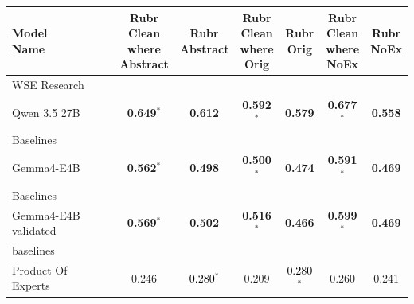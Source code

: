 \begin{tabularx}{\textwidth}{X | c c c c c c}
\hline
\makecell[b]{\textbf{Model} \\ \textbf{Name}} & \makecell[b]{\textbf{Rubr} \\ \textbf{Clean} \\ \textbf{where} \\ \textbf{Abstract}} & \makecell[b]{\textbf{Rubr} \\ \textbf{Abstract}} & \makecell[b]{\textbf{Rubr} \\ \textbf{Clean} \\ \textbf{where} \\ \textbf{Orig}} & \makecell[b]{\textbf{Rubr} \\ \textbf{Orig}} & \makecell[b]{\textbf{Rubr} \\ \textbf{Clean} \\ \textbf{where} \\ \textbf{NoEx}} & \makecell[b]{\textbf{Rubr} \\ \textbf{NoEx}} \\
\hline
WSE Research\\\subcatarrow{}Qwen 3.5 27B & \textbf{\textcolor{BrickRed}{0.649$^{*}$}} & \textbf{\textcolor{BrickRed}{0.612}} & \textbf{\textcolor{BrickRed}{0.592$^{*}$}} & \textbf{\textcolor{BrickRed}{0.579}} & \textbf{\textcolor{BrickRed}{0.677$^{*}$}} & \textbf{\textcolor{BrickRed}{0.558}} \\
Baselines\\\subcatarrow{}Gemma4-E4B & \textbf{\textcolor{White!50!BrickRed}{0.562$^{*}$}} & \textbf{\textcolor{White!50!BrickRed}{0.498}} & \textbf{\textcolor{White!50!BrickRed}{0.500$^{*}$}} & \textbf{\textcolor{White!50!BrickRed}{0.474}} & \textbf{\textcolor{White!50!BrickRed}{0.591$^{*}$}} & \textbf{\textcolor{White!50!BrickRed}{0.469}} \\
Baselines\\\subcatarrow{}Gemma4-E4B validated & \textbf{\textcolor{White!50!BrickRed}{0.569$^{*}$}} & \textbf{\textcolor{White!50!BrickRed}{0.502}} & \textbf{\textcolor{White!50!BrickRed}{0.516$^{*}$}} & \textbf{\textcolor{White!50!BrickRed}{0.466}} & \textbf{\textcolor{White!50!BrickRed}{0.599$^{*}$}} & \textbf{\textcolor{White!50!BrickRed}{0.469}} \\
baselines\\\subcatarrow{}Product Of Experts & \textcolor{White!50!NavyBlue}{0.246} & \textcolor{Black}{0.280$^{*}$} & \textcolor{White!50!NavyBlue}{0.209} & \textcolor{Black}{0.280$^{*}$} & \textcolor{White!50!NavyBlue}{0.260} & \textcolor{White!50!NavyBlue}{0.241} \\

\end{tabularx}
